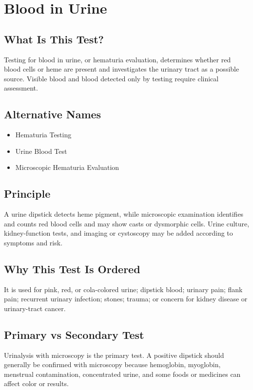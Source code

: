 \chapter{Blood in Urine}

\section*{What Is This Test?}
Testing for blood in urine, or hematuria evaluation, determines whether red blood cells or heme are present and investigates the urinary tract as a possible source. Visible blood and blood detected only by testing require clinical assessment.

\section*{Alternative Names}
\begin{itemize}
  \item Hematuria Testing
  \item Urine Blood Test
  \item Microscopic Hematuria Evaluation
\end{itemize}

\section*{Principle}
A urine dipstick detects heme pigment, while microscopic examination identifies and counts red blood cells and may show casts or dysmorphic cells. Urine culture, kidney-function tests, and imaging or cystoscopy may be added according to symptoms and risk.

\section*{Why This Test Is Ordered}
It is used for pink, red, or cola-colored urine; dipstick blood; urinary pain; flank pain; recurrent urinary infection; stones; trauma; or concern for kidney disease or urinary-tract cancer.

\section*{Primary vs Secondary Test}
Urinalysis with microscopy is the primary test. A positive dipstick should generally be confirmed with microscopy because hemoglobin, myoglobin, menstrual contamination, concentrated urine, and some foods or medicines can affect color or results.

